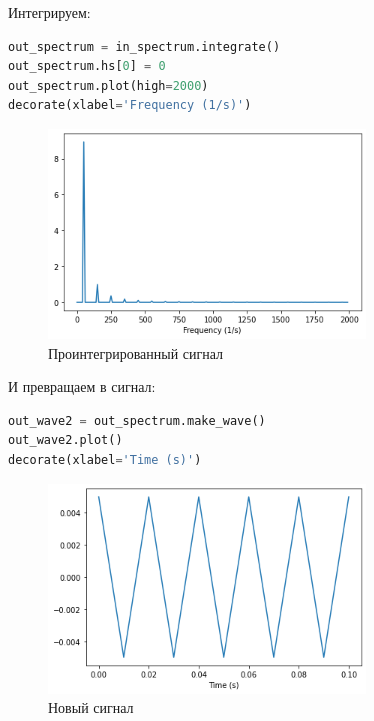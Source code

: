 \documentclass[a4paper,12pt]{report}
\begin{document}
    Интегрируем:
    
\begin{lstlisting}[language=Python,caption=Проинтегрированный сигнал]
out_spectrum = in_spectrum.integrate()
out_spectrum.hs[0] = 0
out_spectrum.plot(high=2000)
decorate(xlabel='Frequency (1/s)')
\end{lstlisting}

    \begin{figure}[H]
        \centering
        \includegraphics[width=0.75\textwidth]{ex2_out_spectrum.png}
        \caption{Проинтегрированный сигнал}
        \label{fig:ex2_out_spectrum}
    \end{figure}

    И превращаем в сигнал:
    
\begin{lstlisting}[language=Python,caption=Новый сигнал]
out_wave2 = out_spectrum.make_wave()
out_wave2.plot()
decorate(xlabel='Time (s)')
\end{lstlisting}

    \begin{figure}[H]
        \centering
        \includegraphics[width=0.75\textwidth]{ex2_out_wave2.png}
        \caption{Новый сигнал}
        \label{fig:ex2_out_wave2}
    \end{figure}
\end{document}
